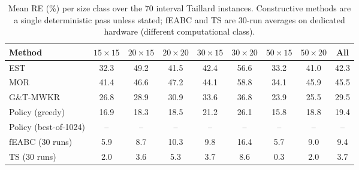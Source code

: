 
\begin{table}[t]
\centering\small
\caption{Mean RE (\%) per size class over the 70 interval
Taillard instances. Constructive methods are a single
deterministic pass unless stated; fEABC and TS are 30-run
averages on dedicated hardware (different computational class).}
\label{tab:seventy}
\begin{tabular}{lcccccccc}
\toprule
Method & $15{\times}15$ & $20{\times}15$ & $20{\times}20$ & $30{\times}15$ & $30{\times}20$ & $50{\times}15$ & $50{\times}20$ & All \\
\midrule
EST & 32.3 & 49.2 & 41.5 & 42.4 & 56.6 & 33.2 & 41.0 & 42.3 \\
MOR & 41.4 & 46.6 & 47.2 & 44.1 & 58.8 & 34.1 & 45.9 & 45.5 \\
G\&T-MWKR & 26.8 & 28.9 & 30.9 & 33.6 & 36.8 & 23.9 & 25.5 & 29.5 \\
Policy (greedy) & 16.9 & 18.3 & 18.5 & 21.2 & 26.1 & 15.8 & 18.8 & 19.4 \\
Policy (best-of-1024) & -- & -- & -- & -- & -- & -- & -- & -- \\
\midrule
fEABC (30 runs) & 5.9 & 8.7 & 10.3 & 9.8 & 16.4 & 5.7 & 9.0 & 9.4 \\
TS (30 runs) & 2.0 & 3.6 & 5.3 & 3.7 & 8.6 & 0.3 & 2.0 & 3.7 \\
\bottomrule
\end{tabular}
\end{table}

